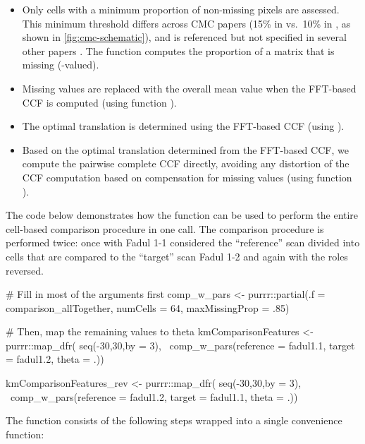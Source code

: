 \begin{itemize}
\item
  Only cells with a minimum proportion of non-missing pixels are
  assessed. This minimum threshold differs across CMC papers (15\% in
  \citet{chen_convergence_2017} vs.~10\% in
  \citet{song_estimating_2018}, as shown in
  \autoref{fig:cmc-schematic}), and is referenced but not specified in
  several other papers
  \citep{tong_fired_2014,song_3d_2014,chu_validation_2013}. The
   function computes the proportion of
  a matrix that is missing (-valued).
\item
  Missing values are replaced with the overall mean value when the
  FFT-based CCF is computed (using function
  ).
\item
  The optimal translation is determined using the FFT-based CCF (using
  ).
\item
  Based on the optimal translation determined from the FFT-based CCF, we
  compute the pairwise complete CCF directly, avoiding any distortion of
  the CCF computation based on compensation for missing values (using
  function ).
\end{itemize}

The code below demonstrates how the 
function can be used to perform the entire cell-based comparison
procedure in one call. The comparison procedure is performed twice: once
with Fadul 1-1 considered the ``reference'' scan divided into cells that
are compared to the ``target'' scan Fadul 1-2 and again with the roles
reversed.

\begin{Schunk}
\begin{Sinput}
# Fill in most of the arguments first
comp_w_pars <- purrr::partial(.f = comparison_allTogether, 
                               numCells = 64, maxMissingProp = .85)

# Then, map the remaining values to theta
kmComparisonFeatures <- purrr::map_dfr(
  seq(-30,30,by = 3), 
  ~comp_w_pars(reference = fadul1.1, target = fadul1.2, theta = .))

kmComparisonFeatures_rev <- purrr::map_dfr(
  seq(-30,30,by = 3), 
  ~comp_w_pars(reference = fadul1.2, target = fadul1.1, theta = .))
\end{Sinput}
\end{Schunk}

The  function consists of the following
steps wrapped into a single convenience function:

